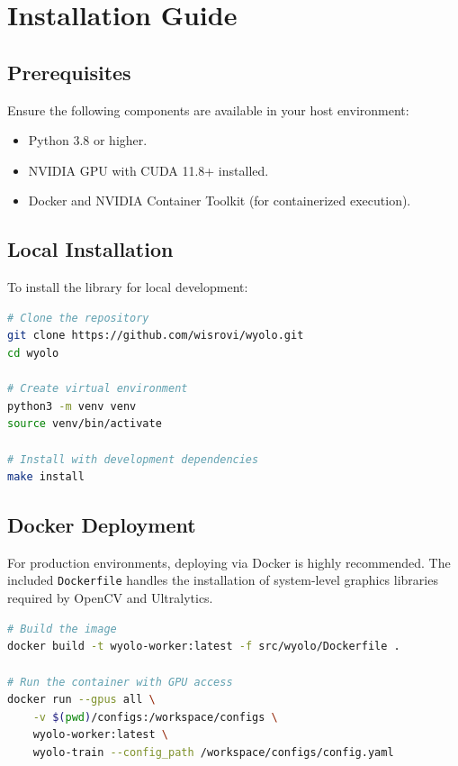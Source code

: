 \documentclass[12pt,a4paper]{report}
\begin{document}
\chapter{Installation Guide}
\cleardoublepage
\section{Prerequisites}
Ensure the following components are available in your host environment:
\begin{itemize}
    \item Python 3.8 or higher.
    \item NVIDIA GPU with CUDA 11.8+ installed.
    \item Docker and NVIDIA Container Toolkit (for containerized execution).
\end{itemize}

\section{Local Installation}
To install the library for local development:

\begin{lstlisting}[language=bash, caption=Local Installation Commands]
# Clone the repository
git clone https://github.com/wisrovi/wyolo.git
cd wyolo

# Create virtual environment
python3 -m venv venv
source venv/bin/activate

# Install with development dependencies
make install
\end{lstlisting}

\section{Docker Deployment}
For production environments, deploying via Docker is highly recommended. The included \texttt{Dockerfile} handles the installation of system-level graphics libraries required by OpenCV and Ultralytics.

\begin{lstlisting}[language=bash, caption=Docker Build and Run]
# Build the image
docker build -t wyolo-worker:latest -f src/wyolo/Dockerfile .

# Run the container with GPU access
docker run --gpus all \
    -v $(pwd)/configs:/workspace/configs \
    wyolo-worker:latest \
    wyolo-train --config_path /workspace/configs/config.yaml
\end{lstlisting}
\end{document}
